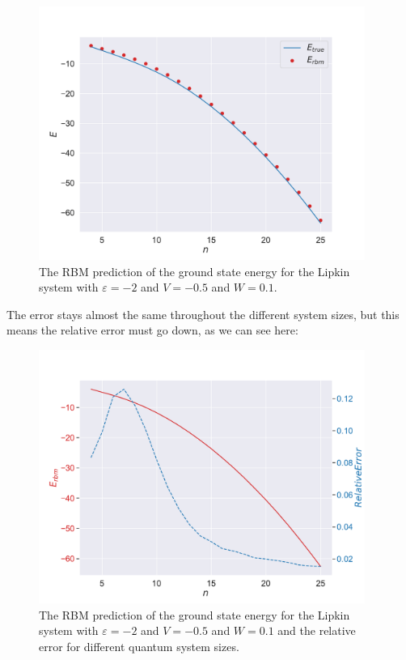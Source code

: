 \begin{figure}[H]
  \begin{center}
    \includegraphics[width=0.95\textwidth]{Figures/Plots/Lipkin/val-true[particles][4-25][e=850][eps=-2][V=-0.5][W=0.1].pdf}
  \end{center}
  \caption{The RBM prediction of the ground state energy for the Lipkin system with $\varepsilon=-2$ and $V=-0.5$ and $W=0.1$.}
\end{figure}

The error stays almost the same throughout the different system sizes, but this means the relative error must go down, as we can see here:

\begin{figure}[H]
  \begin{center}
    \includegraphics[width=0.95\textwidth]{Figures/Plots/Lipkin/[particles][4-25][e=850][eps=-2][V=-0.5][W=0.1]error.pdf}
  \end{center}
  \caption{The RBM prediction of the ground state energy for the Lipkin system with $\varepsilon=-2$ and $V=-0.5$ and $W=0.1$ and the relative error for different quantum system sizes.}
\end{figure}




